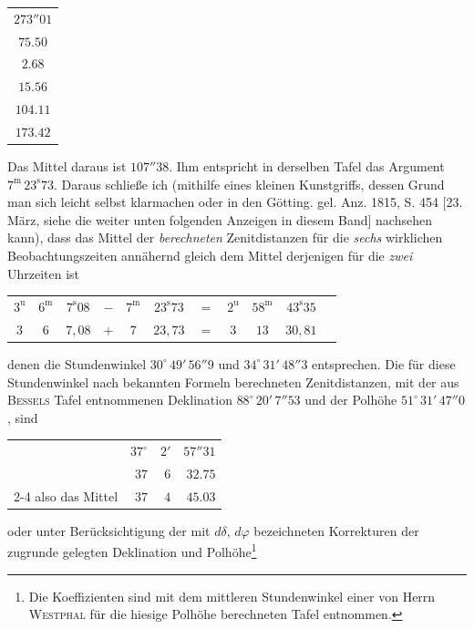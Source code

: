 \begin{center}\fontsize{10}{12}\selectfont\setlength{\tabcolsep}{3pt}\begin{tabular}{c}
$273''01$\\
$75.50$\\
$2.68$\\
$15.56$\\
$104.11$\\
$173.42$\\
\end{tabular}\end{center}

\noindent Das Mittel daraus ist $107''38$. Ihm entspricht in derselben Tafel das Argument $7^{\mathrm m}\,23^{\mathrm s}73$. Daraus schließe ich (mithilfe eines kleinen Kunstgriffs, dessen Grund man sich leicht selbst klarmachen oder in den Götting. gel. Anz. 1815, S. 454 [23. März, siehe die weiter unten folgenden Anzeigen in diesem Band]  nachsehen kann), dass das Mittel der \emph{berechneten} Zenitdistanzen für die \emph{sechs} wirklichen Beobachtungszeiten annähernd gleich dem Mittel derjenigen für die \emph{zwei} Uhrzeiten ist

\begin{center}\fontsize{9}{11}\selectfont\setlength{\tabcolsep}{3pt}\begin{tabular}{ccccccccccc}
$3^{\mathrm u}$ & $6^{\mathrm m}$ & $7^{\mathrm s}08$ & $-$ & $7^{\mathrm m}$ & $23^{\mathrm s}73$ & $=$ & $2^{\mathrm u}$ & $58^{\mathrm m}$ & $43^{\mathrm s}35$\\
$3$ & $6$ & $7{,}08$ & $+$ & $7$ & $23{,}73$ & $=$ & $3$ & $13$ & $30{,}81$\\
\end{tabular}\end{center}

\noindent denen die Stundenwinkel $30^\circ\,49'\,56''9$ und $34^\circ\,31'\,48''3$ entsprechen. Die für diese Stundenwinkel nach bekannten Formeln berechneten Zenitdistanzen, mit der aus \textsc{Bessels} Tafel entnommenen Deklination $88^\circ\,20'\,7''53$ und der Polhöhe $51^\circ\,31'\,47''0$, sind

\begin{center}\fontsize{10}{12}\selectfont\begin{tabular}{lrrr}
& $37^\circ$ & $2'$ & $57''31$\\
& $37$ & $6$ & $32.75$\\\cline{2-4}
also das Mittel & $37$ & $4$ & $45.03$\\
\end{tabular}\end{center}
\noindent oder unter Berücksichtigung der mit $d\delta$, $d\varphi$ bezeichneten Korrekturen der zugrunde gelegten Deklination und Polhöhe\footnote{Die Koeffizienten sind mit dem mittleren Stundenwinkel einer von Herrn \textsc{Westphal} für die hiesige Polhöhe berechneten Tafel entnommen.}


